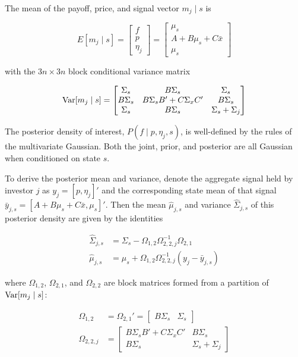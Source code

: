 \documentclass{article}
\begin{document}
The mean of the payoff, price, and signal vector $m_j \mid s$ is

$$
E[m_j \mid s] = \begin{bmatrix}
    f \\ p \\ \eta_j
\end{bmatrix} =
\begin{bmatrix}
    \mu_s \\ A + B\mu_s + C \bar x \\ \mu_s
\end{bmatrix}
$$

\noindent with the $3n \times 3n$ block conditional variance matrix

$$
\text{Var}[m_j \mid s] = \begin{bmatrix}
    \Sigma_s & B \Sigma_s & \Sigma_s \\
    B \Sigma_s & B\Sigma_s B' + C \Sigma_x C' & B \Sigma_s \\
    \Sigma_s & B \Sigma_s & \Sigma_s + \Sigma_j
\end{bmatrix}
$$

The posterior density of interest, $P(f \mid p, \eta_j, s)$, is well-defined by the rules of the multivariate Gaussian. Both the joint, prior, and posterior are all Gaussian when conditioned on state $s$.

To derive the posterior mean and variance, denote the aggregate signal held by investor $j$ as $y_j = [p, \eta_j]'$ and the corresponding state mean of that signal $\bar y_{j,s} = [A + B \mu_s + C \bar x, \mu_s]'$. Then the mean $\hat \mu_{j,s}$ and variance $\hat \Sigma_{j,s}$ of this posterior density are given by the identities

\begin{align*}
    \hat \Sigma_{j,s} &= \Sigma_s - \Omega_{1,2} \Omega_{2,2,j}^{-1} \Omega_{2,1} \\ 
    \hat \mu_{j,s} &= \mu_s + \Omega_{1,2} \Omega_{2,2,j}^{-1} (y_j - \bar y_{j,s})
\end{align*}

\noindent where $\Omega_{1,2}$, $\Omega_{2,1}$, and $\Omega_{2,2}$ are block matrices formed from a partition of $\text{Var}[m_j \mid s]$:

\begin{align*}
    \Omega_{1,2} &= \Omega_{2,1}' = \begin{bmatrix}
        B \Sigma_s & \Sigma_s
    \end{bmatrix} \\
    \Omega_{2,2,j} &= \begin{bmatrix}
        B\Sigma_s B' + C \Sigma_x C' & B \Sigma_s \\
        B \Sigma_s & \Sigma_s + \Sigma_j
    \end{bmatrix}
\end{align*}
\end{document}

